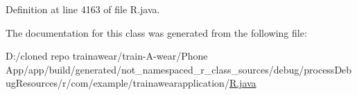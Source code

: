 Definition at line 4163 of file R.\+java.



The documentation for this class was generated from the following file\+:\begin{DoxyCompactItemize}
\item 
D\+:/cloned repo trainawear/train-\/\+A-\/wear/\+Phone App/app/build/generated/not\+\_\+namespaced\+\_\+r\+\_\+class\+\_\+sources/debug/process\+Debug\+Resources/r/com/example/trainawearapplication/\mbox{\hyperlink{process_debug_resources_2r_2com_2example_2trainawearapplication_2_r_8java}{R.\+java}}\end{DoxyCompactItemize}
